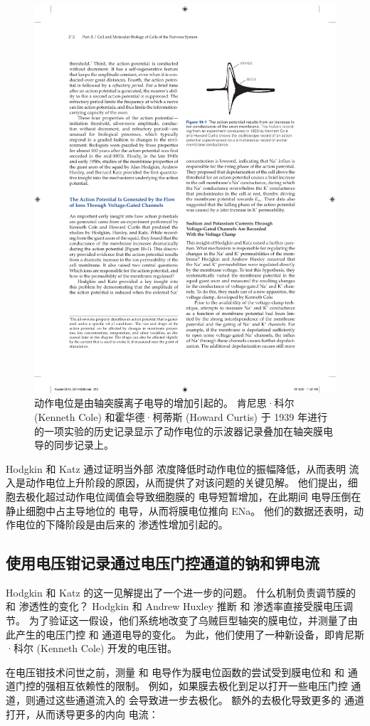 \begin{figure}[htbp]
	\centering
	\includegraphics[width=0.5\linewidth]{chap10/fig_10_1}
	\caption{动作电位是由轴突膜离子电导的增加引起的。 肯尼思·科尔 (Kenneth Cole) 和霍华德·柯蒂斯 (Howard Curtis) 于 1939 年进行的一项实验的历史记录显示了动作电位的示波器记录叠加在轴突膜电导的同步记录上。}
	\label{fig:10_1}
\end{figure}


Hodgkin 和 Katz 通过证明当外部  浓度降低时动作电位的振幅降低，从而表明  流入是动作电位上升阶段的原因，从而提供了对该问题的关键见解。
他们提出，细胞去极化超过动作电位阈值会导致细胞膜的  电导短暂增加，在此期间  电导压倒在静止细胞中占主导地位的  电导，从而将膜电位推向 ENa。 
他们的数据还表明，动作电位的下降阶段是由后来的  渗透性增加引起的。



\subsection{使用电压钳记录通过电压门控通道的钠和钾电流}

Hodgkin 和 Katz 的这一见解提出了一个进一步的问题。
什么机制负责调节膜的  和  渗透性的变化？
Hodgkin 和 Andrew Huxley 推断  和  渗透率直接受膜电压调节。
为了验证这一假设，他们系统地改变了乌贼巨型轴突的膜电位，并测量了由此产生的电压门控  和  通道电导的变化。
为此，他们使用了一种新设备，即肯尼斯·科尔 (Kenneth Cole) 开发的电压钳。


在电压钳技术问世之前，测量  和  电导作为膜电位函数的尝试受到膜电位和  和  通道门控的强相互依赖性的限制。
例如，如果膜去极化到足以打开一些电压门控  通道，则通过这些通道流入的  会导致进一步去极化。 
额外的去极化导致更多的  通道打开，从而诱导更多的内向  电流：


